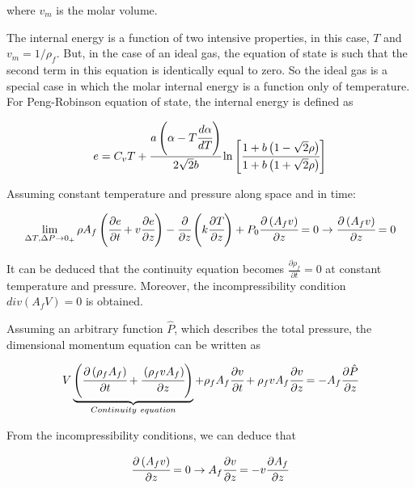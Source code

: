 \documentclass[../Article_Model_Parameters.tex]{subfiles}
\begin{document}
	where $v_m$ is the molar volume.
	
	The internal energy is a function of two intensive properties, in this case, $T$ and $v_m=1/\rho_f$. But, in the case of an ideal gas, the equation of state is such that the second term in this equation is identically equal to zero. So the ideal gas is a special case in which the molar internal energy is a function only of temperature. For Peng-Robinson equation of state, the internal energy is defined as 
	
	{\footnotesize
		\begin{equation*}
			e = C_vT + \cfrac{a\left(\alpha -T\cfrac{d \alpha}{dT}\right)}{2\sqrt{2}b} \ln \left[ \cfrac{1+b\left(1-\sqrt{2}\rho\right) }{1+b\left(1+\sqrt{2}\rho\right)} \right]
	\end{equation*} }
	
	Assuming constant temperature and pressure along space and in time:
	
	{\footnotesize
		\begin{equation*}
			\lim_{\Delta T, \Delta P \rightarrow 0_+ } \rho A_f \left( \cfrac{\partial e }{\partial t} + v \cfrac{\partial e}{\partial z} \right) - \cfrac{\partial}{\partial z} \left( k \cfrac{\partial T}{\partial z} \right) + P_0 \cfrac{\partial \left(A_f v\right)}{\partial z} = 0 \rightarrow \cfrac{\partial \left(A_f v\right)}{\partial z} = 0
		\end{equation*}
	}
	
	It can be deduced that the continuity equation becomes $\frac{\partial \rho_f}{\partial t} = 0$ at constant temperature and pressure. Moreover, the incompressibility condition $div(A_fV)=0$ is obtained.
	
	Assuming an arbitrary function $\hat{P}$, which describes the total pressure, the dimensional momentum equation can be written as
	
	{\footnotesize
		\begin{equation*}
			V \underbrace{ \left( \cfrac{\partial \left(\rho_f A_f\right)}{\partial t} + \cfrac{\left(\rho_f v A_f\right)}{\partial z} \right) }_{Continuity~equation} + \rho_f A_f \cfrac{\partial v}{\partial t} + \rho_f v A_f \cfrac{\partial v}{\partial z} = - A_f \cfrac{\partial \hat{P}}{\partial z}
		\end{equation*}
	}
	
	From the incompressibility conditions, we can deduce that
	
	{\footnotesize
		\begin{equation*}
			\cfrac{\partial \left(A_f v\right)}{\partial z} = 0 \rightarrow A_f \cfrac{\partial v}{\partial z} = - v \cfrac{\partial A_f}{\partial z}
		\end{equation*}
	}
	
\end{document}
